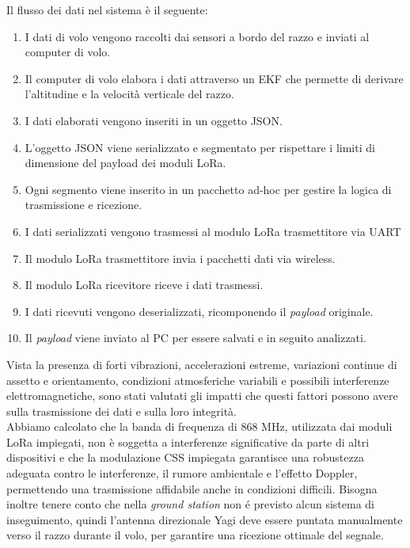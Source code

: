 \documentclass[12pt,a4paper,twoside]{book}
\begin{document}
Il flusso dei dati nel sistema è il seguente:
\begin{enumerate}
    \item I dati di volo vengono raccolti dai sensori a bordo del razzo e inviati al computer di volo.
    \item Il computer di volo elabora i dati attraverso un \ac{EKF} che permette di derivare l'altitudine e la velocità verticale del razzo.
    \item I dati elaborati vengono inseriti in un oggetto JSON.
    \item L'oggetto JSON viene serializzato e segmentato per rispettare i limiti di dimensione del payload dei moduli \ac{LoRa}.
    \item Ogni segmento viene inserito in un pacchetto ad-hoc per gestire la logica di trasmissione e ricezione.
    \item I dati serializzati vengono trasmessi al modulo \ac{LoRa} trasmettitore via \ac{UART}
    \item Il modulo \ac{LoRa} trasmettitore invia i pacchetti dati via wireless.
    \item Il modulo \ac{LoRa} ricevitore riceve i dati trasmessi.
    \item I dati ricevuti vengono deserializzati, ricomponendo il \emph{payload} originale.
    \item Il \emph{payload} viene inviato al PC per essere salvati e in seguito analizzati.
\end{enumerate} 

Vista la presenza di forti vibrazioni, accelerazioni estreme,
variazioni continue di assetto e orientamento, condizioni atmosferiche variabili
e possibili interferenze elettromagnetiche, sono stati valutati
gli impatti che questi fattori possono avere sulla trasmissione dei dati e sulla
loro integrità. \\
Abbiamo calcolato che la banda di frequenza di 868 MHz, utilizzata dai moduli
\ac{LoRa} impiegati, non è soggetta a interferenze significative da parte di altri
dispositivi e che la modulazione \ac{CSS} impiegata garantisce una robustezza
adeguata contro le interferenze, il rumore ambientale e l'effetto Doppler,
permettendo una trasmissione affidabile anche in condizioni difficili.
Bisogna inoltre tenere conto che nella \emph{ground station} non \'e previsto
alcun sistema di inseguimento, quindi l'antenna direzionale Yagi deve essere puntata manualmente
verso il razzo durante il volo, per garantire una ricezione ottimale del segnale.
\end{document}
